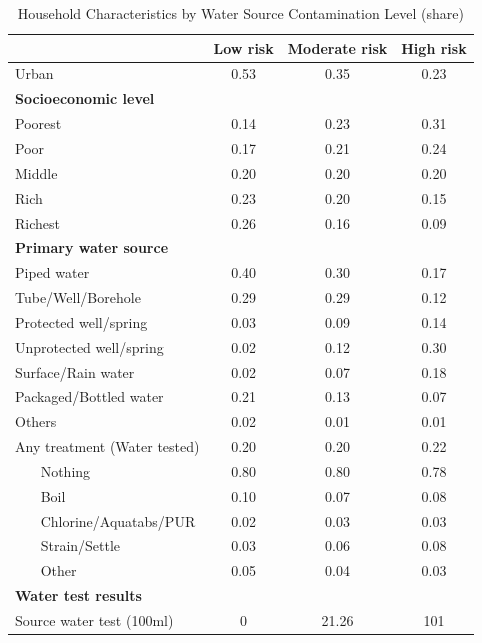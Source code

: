 \begin{table}[htbp]\centering
\def\sym#1{\ifmmode^{#1}\else\(^{#1}\)\fi}
\caption{Household Characteristics by Water Source Contamination Level (share) \label{Desc1}}
\begin{tabular}{l*{3}{c}}
\hline\hline
                    &\multicolumn{1}{c}{Low risk}&\multicolumn{1}{c}{Moderate risk}&\multicolumn{1}{c}{High risk}\\

\hline
Urban               &        0.53&        0.35&        0.23\\
\textbf{Socioeconomic level} \\\hline Poorest             &        0.14&        0.23&        0.31\\
Poor                &        0.17&        0.21&        0.24\\
Middle              &        0.20&        0.20&        0.20\\
Rich                &        0.23&        0.20&        0.15\\
Richest             &        0.26&        0.16&        0.09\\
\textbf{Primary water source} \\\hline Piped water         &        0.40&        0.30&        0.17\\
Tube/Well/Borehole  &        0.29&        0.29&        0.12\\
Protected well/spring&        0.03&        0.09&        0.14\\
Unprotected well/spring&        0.02&        0.12&        0.30\\
Surface/Rain water  &        0.02&        0.07&        0.18\\
Packaged/Bottled water&        0.21&        0.13&        0.07\\
Others              &        0.02&        0.01&        0.01\\
Any treatment (Water tested)&        0.20&        0.20&        0.22\\
~~~ Nothing      &        0.80&        0.80&        0.78\\
~~~ Boil         &        0.10&        0.07&        0.08\\
~~~ Chlorine/Aquatabs/PUR&        0.02&        0.03&        0.03\\
~~~ Strain/Settle&        0.03&        0.06&        0.08\\
~~~ Other        &        0.05&        0.04&        0.03\\
\textbf{Water test results} \\\hline Source water test (100ml)&        0&       21.26&      101\\

\end{tabular}
\end{table}

